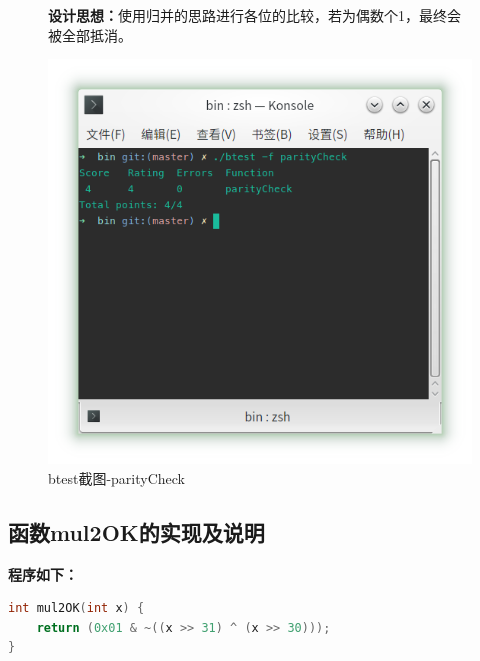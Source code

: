 \begin{figure}[H]
    \begin{minipage}[c]{0.5\linewidth}
        \textbf{设计思想：}使用归并的思路进行各位的比较，若为偶数个1，最终会被全部抵消。
    \end{minipage}
    \begin{minipage}[c]{0.4\linewidth}
        \centering
        \includegraphics[width=0.9\linewidth]{figures/parityCheck}
        \caption{btest截图-parityCheck}
        \label{fig:parityCheck}
    \end{minipage}
\end{figure}

\subsection{函数mul2OK的实现及说明}
\textbf{程序如下：}

\begin{lstlisting}[language = c]
int mul2OK(int x) {
	return (0x01 & ~((x >> 31) ^ (x >> 30)));
}
\end{lstlisting}

